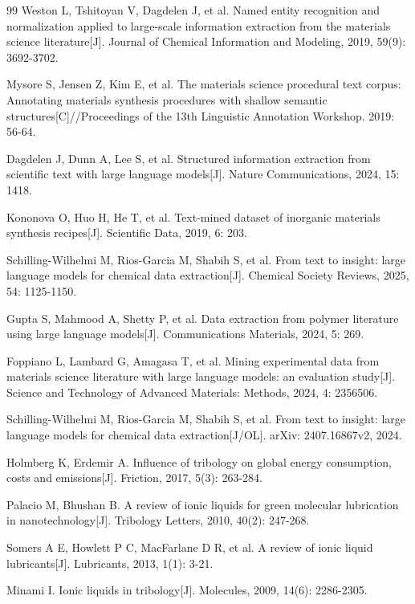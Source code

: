 \begin{thebibliography}{99}
 Weston L, Tshitoyan V, Dagdelen J, et al. Named entity recognition and normalization applied to large-scale information extraction from the materials science literature{[}J{]}. Journal of Chemical Information and Modeling, 2019, 59(9): 3692-3702.

 Mysore S, Jensen Z, Kim E, et al. The materials science procedural text corpus: Annotating materials synthesis procedures with shallow semantic structures{[}C{]}//Proceedings of the 13th Linguistic Annotation Workshop. 2019: 56-64.

 Dagdelen J, Dunn A, Lee S, et al. Structured information extraction from scientific text with large language models{[}J{]}. Nature Communications, 2024, 15: 1418.

 Kononova O, Huo H, He T, et al. Text-mined dataset of inorganic materials synthesis recipes{[}J{]}. Scientific Data, 2019, 6: 203.

 Schilling-Wilhelmi M, Rios-Garcia M, Shabih S, et al. From text to insight: large language models for chemical data extraction{[}J{]}. Chemical Society Reviews, 2025, 54: 1125-1150.

 Gupta S, Mahmood A, Shetty P, et al. Data extraction from polymer literature using large language models{[}J{]}. Communications Materials, 2024, 5: 269.

 Foppiano L, Lambard G, Amagasa T, et al. Mining experimental data from materials science literature with large language models: an evaluation study{[}J{]}. Science and Technology of Advanced Materials: Methods, 2024, 4: 2356506.

 Schilling-Wilhelmi M, Rios-Garcia M, Shabih S, et al. From text to insight: large language models for chemical data extraction{[}J/OL{]}. arXiv: 2407.16867v2, 2024.

 Holmberg K, Erdemir A. Influence of tribology on global energy consumption, costs and emissions{[}J{]}. Friction, 2017, 5(3): 263-284.

 Palacio M, Bhushan B. A review of ionic liquids for green molecular lubrication in nanotechnology{[}J{]}. Tribology Letters, 2010, 40(2): 247-268.

 Somers A E, Howlett P C, MacFarlane D R, et al. A review of ionic liquid lubricants{[}J{]}. Lubricants, 2013, 1(1): 3-21.

 Minami I. Ionic liquids in tribology{[}J{]}. Molecules, 2009, 14(6): 2286-2305.


\end{thebibliography}
